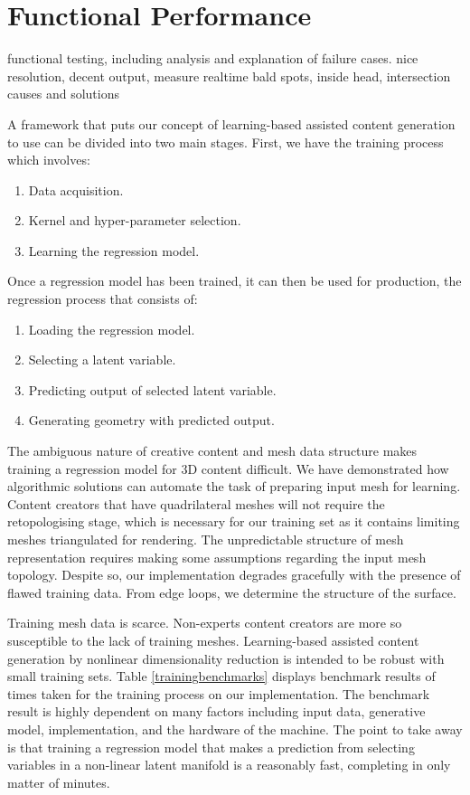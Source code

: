 \documentclass[ %
author={Dillon Keith Diep},
supervisor={Dr. Carl Henrik Ek},
degree={MEng},
title={ART-CG:},
subtitle={Assisted Real-time Content Generation of 3D Hair by Learning Manifolds},
type={Research},
year={2017} ]{dissertation}
\begin{document}
\section{Functional Performance}
{\color{red}
	functional  testing, including analysis and explanation of failure cases.
	nice resolution, decent output, measure realtime
	bald spots, inside head, intersection 
	causes and solutions
}

A framework that puts our concept of learning-based assisted content generation to use can be divided into two main stages. First, we have the training process which involves:
\begin{enumerate}
	\item Data acquisition.
	\item Kernel and hyper-parameter selection.
	\item Learning the regression model.
\end{enumerate}
Once a regression model has been trained, it can then be used for production, the regression process that consists of:
\begin{enumerate}
	\item Loading the regression model.
	\item Selecting a latent variable.
	\item Predicting output of selected latent variable.
	\item Generating geometry with predicted output.
\end{enumerate}

The ambiguous nature of creative content and mesh data structure makes training a regression model for 3D content difficult. We have demonstrated how algorithmic solutions can automate the task of preparing input mesh for learning. Content creators that have quadrilateral meshes will not require the retopologising stage, which is necessary for our training set as it contains limiting meshes triangulated for rendering. The unpredictable structure of mesh representation requires making some assumptions regarding the input mesh topology. Despite so, our implementation degrades gracefully with the presence of flawed training data. From edge loops, we determine the structure of the surface.

Training mesh data is scarce. Non-experts content creators are more so susceptible to the lack of training meshes. Learning-based assisted content generation by nonlinear dimensionality reduction is intended to be robust with small training sets. Table \ref{trainingbenchmarks} displays benchmark results of times taken for the training process on our implementation. The benchmark result is highly dependent on many factors including input data, generative model, implementation, and the hardware of the machine. The point to take away is that training a regression model that makes a prediction from selecting variables in a non-linear latent manifold is a reasonably fast, completing in only matter of minutes.
\end{document}
